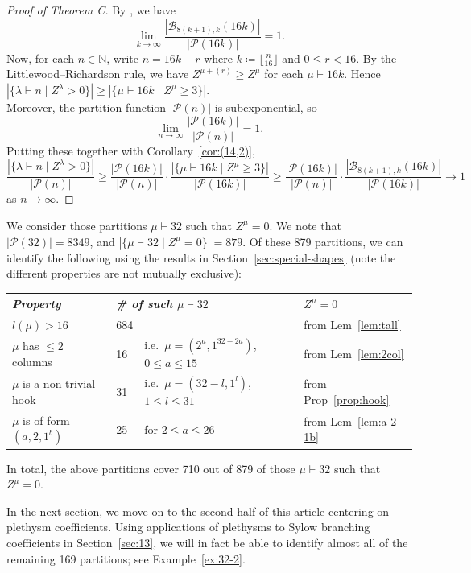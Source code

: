 \documentclass[ALCO, Unicode]{cedram}
\newcommand{\cB}{\mathcal{B}}
\newcommand{\cP}{\mathcal{P}}
\newcommand{\N}{\mathbb{N}}
\begin{document}
\begin{proof}[Proof of Theorem C]
	By \cite[(1.4)]{EL}, we have
	\[ \lim_{k\to\infty}\frac{|\cB_{8(k+1),k}(16k)|}{|\cP(16k)|} = 1. \]
	Now, for each $n\in\N$, write $n=16k+r$ where $k\coloneqq \lfloor\tfrac{n}{16}\rfloor$ and $0\le r<16$. By the Littlewood--Richardson rule, we have $Z^{\mu+(r)}\geq Z^{\mu}$ for each $\mu\vdash 16k$. Hence $|\{\lambda\vdash n\mid Z^\lambda>0\}|\geq|\{\mu\vdash16k\mid Z^\mu\geq3\}|$.\\
	Moreover, the partition function $|\cP(n)|$ is subexponential, so 
	\[ \lim_{n\to\infty}\frac{|\cP(16k)|}{|\cP(n)|} = 1. \]
	Putting these together with Corollary~\ref{cor:(14,2)},
	\[ \frac{|\{\lambda\vdash n\mid Z^\lambda>0\}|}{|\cP(n)|} \geq \frac{|\cP(16k)|}{|\cP(n)|}\cdot \frac{|\{\mu\vdash16k\mid Z^\mu\geq3\}|}{|\cP(16k)|} \geq \frac{|\cP(16k)|}{|\cP(n)|}\cdot \frac{|\cB_{8(k+1),k}(16k)|}{|\cP(16k)|}\to 1 \]
	as $n\to\infty$.
\end{proof}

\begin{example}\label{ex:32-1}
	We consider those partitions $\mu\vdash 32$ such that $Z^\mu=0$. We note that $|\cP(32)|=8349$, and $|\{\mu\vdash 32\mid Z^\mu=0\}|=879$. Of these 879 partitions, we can identify the following using the results in Section~\ref{sec:special-shapes} (note the different properties are not mutually exclusive):
	
	\begin{tabular}{l|ll|l}
		\textit{Property} & \multicolumn{2}{l|}{\textit{\# of such $\mu\vdash 32$}} & \textit{$Z^\mu=0$} \\
		\hline
		$l(\mu)>16$ & 684 & & from Lem~\ref{lem:tall}\\
		$\mu$ has $\le 2$ columns & 16 & i.e.~$\mu=(2^a,1^{32-2a})$, $0\le a\le 15$ & from Lem~\ref{lem:2col}\\
		$\mu$ is a non-trivial hook & 31 & i.e.~$\mu=(32-l,1^l)$, $1\le l\le 31$ & from Prop~\ref{prop:hook}\\
		$\mu$ is of form $(a,2,1^b)$ & 25 & for $2\le a\le 26$ & from Lem~\ref{lem:a-2-1b}\\
	\end{tabular}
	
	\noindent In total, the above partitions cover 710 out of 879 of those $\mu\vdash 32$ such that $Z^\mu=0$. 
	
	In the next section, we move on to the second half of this article centering on plethysm coefficients. Using applications of plethysms to Sylow branching coefficients in Section~\ref{sec:13}, we will in fact be able to identify almost all of the remaining 169 partitions; see Example~\ref{ex:32-2}.%
\end{example}
\end{document}
